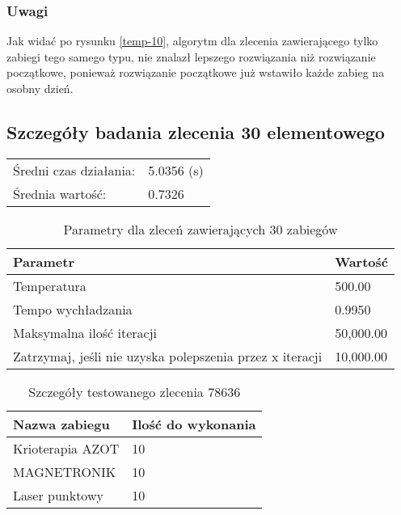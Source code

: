 \subsubsection{Uwagi} 
Jak widać po rysunku \ref{temp-10}, algorytm dla zlecenia
zawierającego tylko zabiegi tego samego typu, nie znalazł lepszego rozwiązania
niż rozwiązanie początkowe, ponieważ rozwiązanie początkowe już wstawiło każde zabieg na osobny dzień.

\newpage
\subsection{Szczegóły badania zlecenia 30 elementowego}
\begin{table}[H]
\begin{tabular}{ l l }
	Średni czas działania: & 5.0356 (s) \\
Średnia wartość: & 0.7326 \\
\end{tabular}
\end{table}

\begin{table}[H]
\centering
\begin{tabularx}{1\textwidth}{ | l | X | }
\hline
\bfseries Parametr & \bfseries Wartość \\
\hline
Temperatura & 500.00 \\
\hline
Tempo wychładzania & 0.9950 \\
\hline
Maksymalna ilość iteracji & 50,000.00 \\
\hline
Zatrzymaj, jeśli nie uzyska polepszenia przez x iteracji & 10,000.00 \\
\hline
\end{tabularx}
\caption{Parametry dla zleceń zawierających 30 zabiegów}
\end{table}

\begin{table}[H]
\centering
\begin{tabularx}{1\textwidth}{ | X | l | }
\hline
\bfseries Nazwa zabiegu & \bfseries Ilość do wykonania \\
\hline
Krioterapia AZOT & 10 \\
\hline
MAGNETRONIK & 10 \\
\hline
Laser punktowy & 10 \\
\hline
\end{tabularx}
\caption{Szczegóły testowanego zlecenia 78636}
\end{table}

